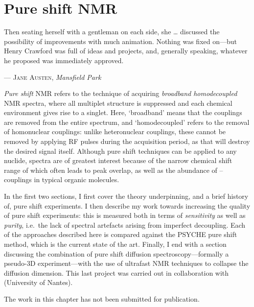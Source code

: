 \chapter{Pure shift NMR}
\label{chpt:pureshift}

\epigraph{\singlespacing%
Then seating herself with a gentleman on each side, she \ldots{} discussed the possibility of improvements with much animation. Nothing was fixed on---but Henry Crawford was full of ideas and projects, and, generally speaking, whatever he proposed was immediately approved.
}{--- \textsc{Jane Austen}, \textit{Mansfield Park}}

\textit{Pure shift} NMR refers to the technique of acquiring \textit{broadband homodecoupled} NMR spectra, where all multiplet structure is suppressed and each chemical environment gives rise to a singlet.\autocite{Zangger2015PNMRS,Castanar2017MRC}
Here, `broadband' means that the couplings are removed from the entire spectrum, and `homodecoupled' refers to the removal of homonuclear couplings: unlike heteronuclear couplings, these cannot be removed by applying RF pulses during the acquisition period, as that will destroy the desired signal itself.
Although pure shift techniques can be applied to any nuclide, \proton{} spectra are of greatest interest because of the narrow chemical shift range of \proton{} which often leads to peak overlap, as well as the abundance of \proton{}--\proton{} couplings in typical organic molecules.

In the first two sections, I first cover the theory underpinning, and a brief history of, pure shift experiments.
I then describe my work towards increasing the quality of pure shift experiments: this is measured both in terms of \textit{sensitivity} as well as \textit{purity}, i.e.\ the lack of spectral artefacts arising from imperfect decoupling.
Each of the approaches described here is compared against the PSYCHE pure shift method, which is the current state of the art.
Finally, I end with a section discussing the combination of pure shift diffusion spectroscopy---formally a pseudo-3D experiment---with the use of ultrafast NMR techniques to collapse the diffusion dimension.
This last project was carried out in collaboration with \JND{} (University of Nantes).

The work in this chapter has not been submitted for publication.

\clearpage









\printbibliography[heading=subbibnumbered]{}
